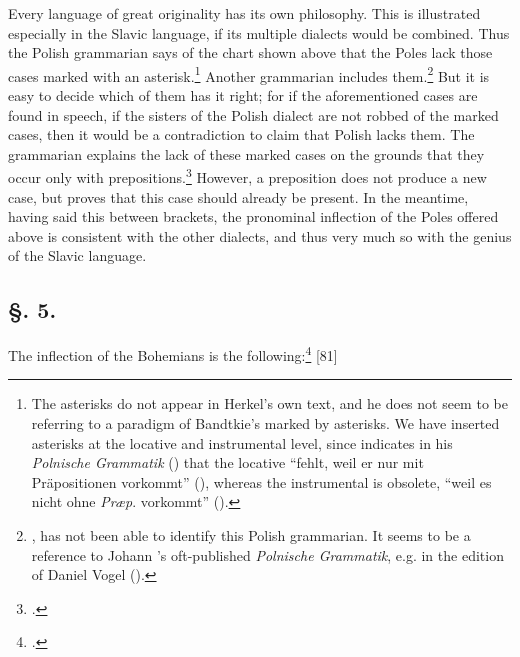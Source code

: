 Every language of great originality has its own philosophy. This is illustrated especially in the Slavic language, if its multiple dialects would be combined. Thus the Polish grammarian says of the chart shown above that the Poles lack those cases marked with an asterisk.\footnote{The asterisks do not appear in Herkel’s own text, and he does not seem to be referring to a paradigm of Bandtkie’s marked by asterisks. We have inserted asterisks at the locative and instrumental level, since \citeauthor{bandtkie_polnische_1808} indicates in his \textit{Polnische Grammatik} (\citeyear[224--225]{bandtkie_polnische_1808}) that the locative “fehlt, weil er nur mit Präpositionen vorkommt” (\citeyear[225]{bandtkie_polnische_1808}), whereas the instrumental is obsolete, “weil es nicht ohne \textit{Præp}. vorkommt” (\citeyear[225]{bandtkie_polnische_1808}).} Another grammarian includes them.\footnote{\citet[212, fn. 220]{herkel_jan_2009}, has not been able to identify this Polish grammarian. It seems to be a reference to Johann \citeauthor{moneta_polnische_1805}’s oft-published \textit{Polnische Grammatik}, e.g. in the edition of Daniel Vogel (\citeyear[184 (\textit{jego}, \textit{jemu})]{moneta_polnische_1805}).} But it is easy to decide which of them has it right; for if the aforementioned cases are found in speech, if the sisters of the Polish dialect are not robbed of the marked cases, then it would be a contradiction to claim that Polish lacks them. The grammarian explains the lack of these marked cases on the grounds that they occur only with prepositions.\footnote{\citet[225]{bandtkie_polnische_1808}.} However, a preposition does not produce a new case, but proves that this case should already be present. In the meantime, having said this between brackets, the pronominal inflection of the Poles offered above is consistent with the other dialects, and thus very much so with the genius of the Slavic language.

\subsection*{\hspace*{\fill}§. 5.\hspace*{\fill}}

The inflection of the Bohemians is the following:\footnote{\citet[282]{dobrovsky_ausfuhrliches_1809}.} [81]

